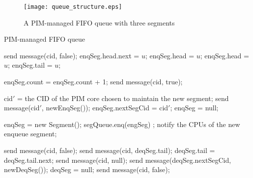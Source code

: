 \begin{figure}[ht!]
\centering
\texttt{[image: queue\_structure.eps]}
\caption{A PIM-managed FIFO queue with three segments}
\label{figure:queue_structure}
\end{figure}

\begin{algorithm*}[ht!]
{\footnotesize
\caption{PIM-managed FIFO queue}
\label{alg:queue}
\vspace{-2.5ex}
\begin{multicols}{2}
\begin{algorithmic}[1]
        \State send message(cid, false);
    \Else
            \State enqSeg.head.next = $u$;
            \State enqSeg.head = $u$;
        \Else
            \State enqSeg.head = $u$;
            \State enqSeg.tail = $u$;
        \EndIf

        \State enqSeg.count = enqSeg.count + 1;
        \State send message(cid, true);

            \State cid$'$ = the CID of the PIM core chosen to maintain the new segment;
            \State send message(cid$'$, newEnqSeg());
            \State enqSeg.nextSegCid = cid$'$;
            \State enqSeg = null;
        \EndIf
    \EndIf
\item[]
\EndProcedure
\algstore{}
\end{algorithmic}

\begin{algorithmic}[1]
\algrestore{}
	\State enqSeg = new Segment();
	\State segQueue.enq(engSeg) ;
	\State notify the CPUs of the new enqueue segment;
\EndProcedure
\algstore{}
\end{algorithmic}
\columnbreak

\begin{algorithmic}[1]
\algrestore{}
        \State send message(cid, false);
    \Else
			\State send message(cid, deqSeg.tail);
            \State deqSeg.tail = deqSeg.tail.next;   
        \Else
				\State send message(cid, null);
			\Else
                \State send message(deqSeg.nextSegCid, newDeqSeg());
                \State deqSeg = null;
                \State send message(cid, false);
            \EndIf            
        \EndIf 
    \EndIf     
\item[]
\EndProcedure
\algstore{}
\end{algorithmic}


\end{multicols}}
\end{algorithm*}
